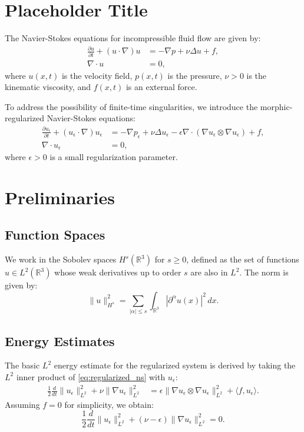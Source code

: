 \section{Placeholder Title}
The Navier-Stokes equations for incompressible fluid flow are given by:
\begin{align}
    \frac{\partial u}{\partial t} + (u \cdot \nabla)u &= -\nabla p + \nu \Delta u + f, \label{eq:navier_stokes} \\
    \nabla \cdot u &= 0, \label{eq:incompressibility}
\end{align}
where $u(x, t)$ is the velocity field, $p(x, t)$ is the pressure, $\nu > 0$ is the kinematic viscosity, and $f(x, t)$ is an external force.

To address the possibility of finite-time singularities, we introduce the morphic-regularized Navier-Stokes equations:
\begin{align}
    \frac{\partial u_\epsilon}{\partial t} + (u_\epsilon \cdot \nabla)u_\epsilon &= -\nabla p_\epsilon + \nu \Delta u_\epsilon - \epsilon \nabla \cdot (\nabla u_\epsilon \otimes \nabla u_\epsilon) + f, \label{eq:regularized_ns} \\
    \nabla \cdot u_\epsilon &= 0, \label{eq:regularized_incompressibility}
\end{align}
where $\epsilon > 0$ is a small regularization parameter.

\section{Preliminaries}

\subsection{Function Spaces}
We work in the Sobolev spaces $H^s(\mathbb{R}^3)$ for $s \geq 0$, defined as the set of functions $u \in L^2(\mathbb{R}^3)$ whose weak derivatives up to order $s$ are also in $L^2$. The norm is given by:
\[
    \|u\|_{H^s}^2 = \sum_{|\alpha| \leq s} \int_{\mathbb{R}^3} |\partial^\alpha u(x)|^2 \, dx.
\]

\subsection{Energy Estimates}
The basic $L^2$ energy estimate for the regularized system is derived by taking the $L^2$ inner product of \eqref{eq:regularized_ns} with $u_\epsilon$:
\begin{align*}
    \frac{1}{2} \frac{d}{dt}\|u_\epsilon\|_{L^2}^2 + \nu \|\nabla u_\epsilon\|_{L^2}^2 &= \epsilon \|\nabla u_\epsilon \otimes \nabla u_\epsilon\|_{L^2}^2 + \langle f, u_\epsilon \rangle.
\end{align*}
Assuming $f = 0$ for simplicity, we obtain:
\[
    \frac{1}{2} \frac{d}{dt}\|u_\epsilon\|_{L^2}^2 + (\nu - \epsilon) \|\nabla u_\epsilon\|_{L^2}^2 = 0.
\]

